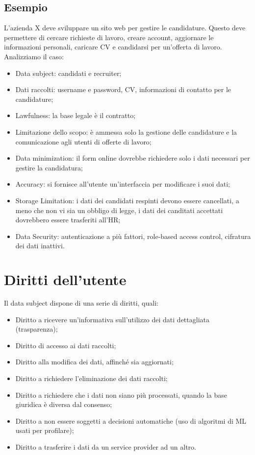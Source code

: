 \subsection{Esempio}
L'azienda X deve sviluppare un sito web per gestire le candidature. Questo deve permettere di cercare richieste di lavoro, creare account, aggiornare le informazioni personali, caricare CV e candidarsi per un'offerta di lavoro. Analizziamo il caso:
\begin{itemize}
    \item Data subject: candidati e recruiter;
    \item Dati raccolti: username e password, CV, informazioni di contatto per le candidature;
    \item Lawfulness: la base legale è il contratto;
    \item Limitazione dello scopo: è ammessa solo la gestione delle candidature e la comunicazione agli utenti di offerte di lavoro;
    \item Data minimization: il form online dovrebbe richiedere solo i dati necessari per gestire la candidatura;
    \item Accuracy: si fornisce all'utente un'interfaccia per modificare i suoi dati;
    \item Storage Limitation: i dati dei candidati respinti devono essere cancellati, a meno che non vi sia un obbligo di legge, i dati dei canditati accettati dovrebbero essere trasferiti all'HR;
    \item Data Security: autenticazione a più fattori, role-based access control, cifratura dei dati inattivi.
\end{itemize}


\section{Diritti dell'utente}
Il data subject dispone di una serie di diritti, quali:
\begin{itemize}
    \item Diritto a ricevere un'informativa sull'utilizzo dei dati dettagliata (trasparenza);
    \item Diritto di accesso ai dati raccolti;
    \item Diritto alla modifica dei dati, affinché sia aggiornati;
    \item Diritto a richiedere l'eliminazione dei dati raccolti;
    \item Diritto a richiedere che i dati non siano più processati, quando la base giuridica è diversa dal consenso;
    \item Diritto a non essere soggetti a decisioni automatiche (uso di algoritmi di ML usati per profilare);
    \item Diritto a trasferire i dati da un service provider ad un altro.
\end{itemize}

